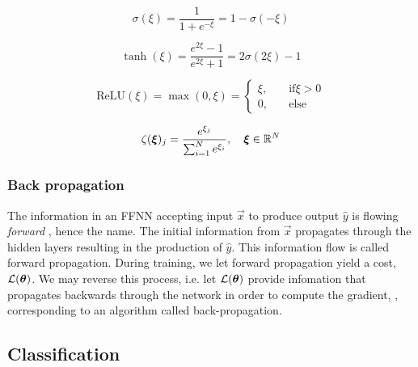     
    \begin{equation}\label{eq:sigmoid}
        \sigma(\xi) = \frac{1}{1+e^{-\xi}} = 1- \sigma(-\xi)
    \end{equation}

    \begin{equation}\label{eq:tanh}
        \tanh(\xi) = \frac{e^{2\xi}-1}{e^{2\xi}+1} = 2\sigma(2\xi) -1
    \end{equation}

    \begin{equation}\label{eq:relu}
        \mathrm{ReLU}(\xi) = \max(0,\xi) = \begin{cases}
            \xi,\quad &\mathrm{if } \xi >0 \\
            0,\quad &\mathrm{else}
        \end{cases}
    \end{equation}

    \begin{equation}\label{eq:softmax}
        \zeta(\svec{\xi})_j = \frac{e^{\xi_j}}{\sum\nolimits_{i=1}^{N}e^{\xi_i}}, \quad \svec{\xi} \in \RR[N]
    \end{equation}





    \subsubsection{Back propagation}\label{sec:back_propagation}


    The information in an FFNN accepting input $\vec{x}$ to produce output $\hat{y}$  is flowing \textit{forward} \citep{Goodfellow2016}, hence the name. The initial information from $\vec{x}$ propagates through the hidden layers resulting in the production of $\hat{y}$. This information flow is called forward propagation. During training, we let forward propagation yield a cost, $\mathcal{L}(\svec{\theta})$. We may reverse this process, i.e. let $\mathcal{L}(\svec{\theta})$ provide infomation that propagates backwards through the network in order to compute the gradient, , corresponding to an algorithm called back-propagation.


\subsection{Classification}\label{sec:classification}

